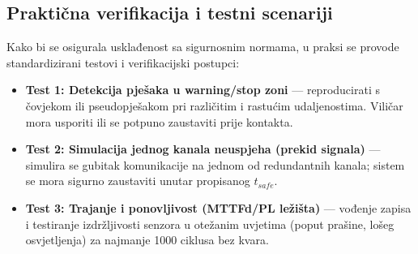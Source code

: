 \subsection{Praktična verifikacija i testni scenariji}
Kako bi se osigurala usklađenost sa sigurnosnim normama, u praksi se provode standardizirani testovi i verifikacijski postupci:
\begin{itemize}
    \item \textbf{Test 1: Detekcija pješaka u warning/stop zoni} — reproducirati s čovjekom ili pseudopješakom pri različitim i rastućim udaljenostima. Viličar mora usporiti ili se potpuno zaustaviti prije kontakta.
    \item \textbf{Test 2: Simulacija jednog kanala neuspjeha (prekid signala)} — simulira se gubitak komunikacije na jednom od redundantnih kanala; sistem se mora sigurno zaustaviti unutar propisanog $t_{safe}$.
    \item \textbf{Test 3: Trajanje i ponovljivost (MTTFd/PL ležišta)} — vođenje zapisa i testiranje izdržljivosti senzora u otežanim uvjetima (poput prašine, lošeg osvjetljenja) za najmanje 1000 ciklusa bez kvara.
\end{itemize}
